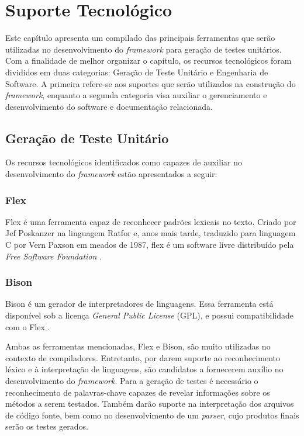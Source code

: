 \chapter[Suporte Tecnológico]{Suporte Tecnológico}
Este capítulo apresenta um compilado das principais ferramentas que serão utilizadas no desenvolvimento do \textit{framework} para geração de testes unitários. Com a finalidade de melhor organizar o capítulo, os recursos tecnológicos foram divididos em duas categorias: Geração de Teste Unitário e Engenharia de Software. A primeira refere-se aos suportes que serão utilizados na construção do \textit{framework}, enquanto a segunda categoria visa auxiliar o gerenciamento e desenvolvimento do software e documentação relacionada.

\section{Geração de Teste Unitário} \label{suporteGeracao}
Os recursos tecnológicos identificados como capazes de auxiliar no desenvolvimento do \textit{framework} estão apresentados a seguir:

\subsection{Flex}
Flex é uma ferramenta capaz de reconhecer padrões lexicais no texto. Criado por Jef Poskanzer na linguagem Ratfor e, anos mais tarde, traduzido para linguagem C por Vern Paxson em meados de 1987, flex é um software livre distribuído pela \textit{Free Software Foundation} \cite{flex2008}.

\subsection{Bison}
Bison é um gerador de interpretadores de linguagens. Essa ferramenta está disponível sob a licença \textit{General Public License} (GPL), e possui compatibilidade com o Flex \cite{bison2014}.
\par
\indent Ambas as ferramentas mencionadas, Flex e Bison, são muito utilizadas no contexto de compiladores. Entretanto, por darem suporte ao reconhecimento léxico e à interpretação de linguagens, são candidatos a fornecerem auxílio no desenvolvimento do \textit{framework}. Para a geração de testes é necessário o reconhecimento de palavras-chave capazes de revelar informações sobre os métodos a serem testados. Também darão suporte na interpretação dos arquivos de código fonte, bem como no desenvolvimento de um \textit{parser}, cujo produtos finais serão os testes gerados.

